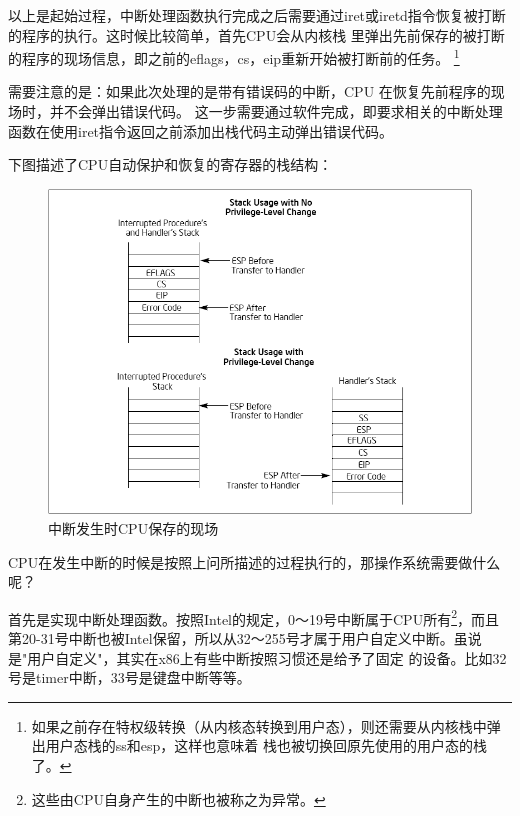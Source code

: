 \par 以上是起始过程，中断处理函数执行完成之后需要通过iret或iretd指令恢复被打断的程序的执行。这时候比较简单，首先CPU会从内核栈\allowbreak
里弹出先前保存的被打断的程序的现场信息，即之前的eflags，cs，eip重新开始被打断前的任务。\allowbreak
\footnote{如果之前存在特权级转换（从内核态转换到用户态），则还需要从内核栈中弹出用户态栈的ss和esp，这样也意味着\allowbreak
栈也被切换回原先使用的用户态的栈了。}
\par 需要注意的是：如果此次处理的是带有错误码的中断，CPU 在恢复先前程序的现场时，并不会弹出错误代码。\allowbreak
这一步需要通过软件完成，即要求相关的中断处理函数在使用iret指令返回之前添加出栈代码主动弹出错误代码。

\par 下图描述了CPU自动保护和恢复的寄存器的栈结构：
\begin{figure}[H]
      \centering
      \includegraphics[scale=0.4]{picture/chapt7/interrupt_stack.png}
      \caption{中断发生时CPU保存的现场}
\end{figure}

\par CPU在发生中断的时候是按照上问所描述的过程执行的，那操作系统需要做什么呢？

\par 首先是实现中断处理函数。按照Intel的规定，0～19号中断属于CPU所有\footnote{这些由CPU自身产生的中断也被称之为异常。}，而且\allowbreak
第20-31号中断也被Intel保留，所以从32～255号才属于用户自定义中断。虽说是"用户自定义"，其实在x86上有些中断按照习惯还是给予了固定\allowbreak
的设备。比如32号是timer中断，33号是键盘中断等等。

